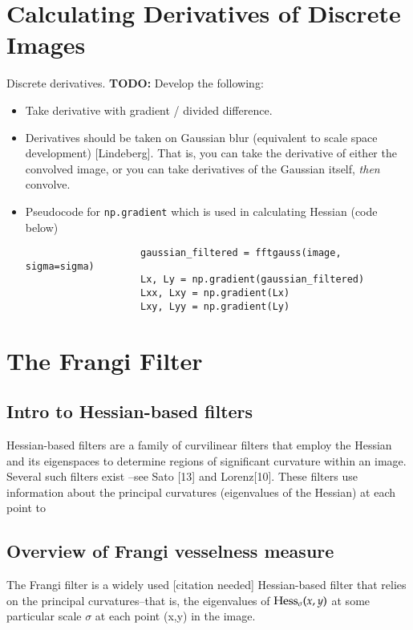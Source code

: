 \section{Calculating Derivatives of Discrete Images} 
	Discrete derivatives. \maltese\textbf{TODO:} Develop the following:
	\begin{itemize}
		\item Take derivative with gradient / divided difference.
		\item Derivatives should be taken on Gaussian blur (equivalent to scale space development) [Lindeberg]. That is, you can take the derivative of either the convolved image, or you can take derivatives of the Gaussian itself, \textit{then} convolve.
		\item Pseudocode for \texttt{np.gradient} which is used in calculating Hessian (code below)
					\begin{verbatim}
					gaussian_filtered = fftgauss(image, sigma=sigma)
					Lx, Ly = np.gradient(gaussian_filtered)
					Lxx, Lxy = np.gradient(Lx)
					Lxy, Lyy = np.gradient(Ly)
					\end{verbatim}
				
		\end{itemize}

\hrulefill
\section{The Frangi Filter}


    \subsection{Intro to Hessian-based filters}

        Hessian-based filters are a family of curvilinear filters that employ the Hessian and its eigenspaces
        to determine regions of significant curvature within an image.
        Several such filters exist --see Sato [13] and Lorenz[10]. These filters use information about the principal curvatures (eigenvalues of the Hessian) at each point to 
    \subsection{Overview of Frangi vesselness measure}
        The Frangi filter is a widely used [citation needed] Hessian-based filter that relies on the principal curvatures--that is,
        the eigenvalues of $\mathrm{Hess}_\sigma(x,y)$ at some particular scale $\sigma$ at each point (x,y) in the image. 
